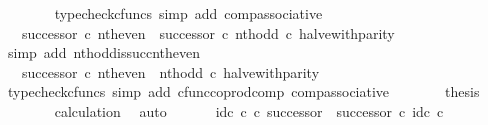 \begin{isabellebody}
\ \ \ \ \ \ \isamarkupfalse%
\ {\isacharparenleft}{\kern0pt}typecheck{\isacharunderscore}{\kern0pt}cfuncs{\isacharcomma}{\kern0pt}\ simp\ add{\isacharcolon}{\kern0pt}\ comp{\isacharunderscore}{\kern0pt}associative{}{\isacharparenright}{\kern0pt}\isanewline
\ \ \ \ \isamarkupfalse%
\ \isamarkupfalse%
\ {\isachardoublequoteopen}{\isachardot}{\kern0pt}{\isachardot}{\kern0pt}{\isachardot}{\kern0pt}\ {\isacharequal}{\kern0pt}\ {\isacharparenleft}{\kern0pt}successor\ {\isasymcirc}\isactrlsub c\ nth{\isacharunderscore}{\kern0pt}even{\isacharparenright}{\kern0pt}\ {\isasymamalg}\ {\isacharparenleft}{\kern0pt}successor\ {\isasymcirc}\isactrlsub c\ nth{\isacharunderscore}{\kern0pt}odd{\isacharparenright}{\kern0pt}\ {\isasymcirc}\isactrlsub c\ halve{\isacharunderscore}{\kern0pt}with{\isacharunderscore}{\kern0pt}parity{\isachardoublequoteclose}\isanewline
\ \ \ \ \ \ \isamarkupfalse%
\ {\isacharparenleft}{\kern0pt}simp\ add{\isacharcolon}{\kern0pt}\ nth{\isacharunderscore}{\kern0pt}odd{\isacharunderscore}{\kern0pt}is{\isacharunderscore}{\kern0pt}succ{\isacharunderscore}{\kern0pt}nth{\isacharunderscore}{\kern0pt}even{\isacharparenright}{\kern0pt}\isanewline
\ \ \ \ \isamarkupfalse%
\ \isamarkupfalse%
\ {\isachardoublequoteopen}{\isachardot}{\kern0pt}{\isachardot}{\kern0pt}{\isachardot}{\kern0pt}\ {\isacharequal}{\kern0pt}\ successor\ {\isasymcirc}\isactrlsub c\ nth{\isacharunderscore}{\kern0pt}even\ {\isasymamalg}\ nth{\isacharunderscore}{\kern0pt}odd\ {\isasymcirc}\isactrlsub c\ halve{\isacharunderscore}{\kern0pt}with{\isacharunderscore}{\kern0pt}parity{\isachardoublequoteclose}\isanewline
\ \ \ \ \ \ \isamarkupfalse%
\ {\isacharparenleft}{\kern0pt}typecheck{\isacharunderscore}{\kern0pt}cfuncs{\isacharcomma}{\kern0pt}\ simp\ add{\isacharcolon}{\kern0pt}\ cfunc{\isacharunderscore}{\kern0pt}coprod{\isacharunderscore}{\kern0pt}comp\ comp{\isacharunderscore}{\kern0pt}associative{}{\isacharparenright}{\kern0pt}\isanewline
\ \ \ \ \isamarkupfalse%
\ \isamarkupfalse%
\ {\isacharquery}{\kern0pt}thesis\isanewline
\ \ \ \ \ \ \isamarkupfalse%
\ calculation\ \isamarkupfalse%
\ auto\isanewline
\ \ \isamarkupfalse%
\isanewline
\isanewline
\ \ \isamarkupfalse%
\ {\isachardoublequoteopen}id\isactrlsub c\ {\isasymnat}\isactrlsub c\ {\isasymcirc}\isactrlsub c\ successor\ {\isacharequal}{\kern0pt}\ successor\ {\isasymcirc}\isactrlsub c\ id\isactrlsub c\ {\isasymnat}\isactrlsub c{\isachardoublequoteclose}\isanewline

\end{isabellebody}
